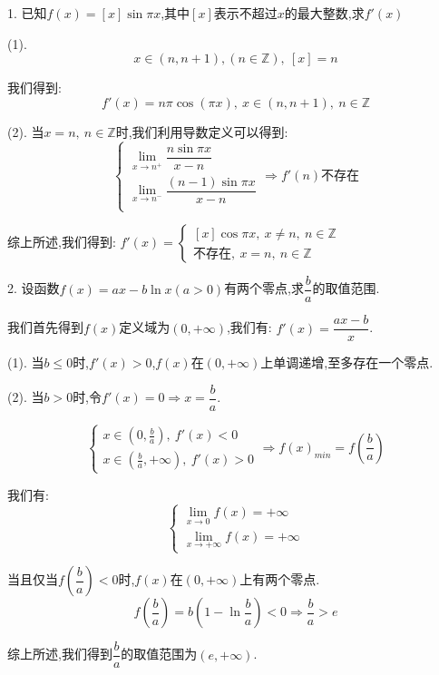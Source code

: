 1. 已知$f(x)=[x]\sin \pi x$,其中$[x]$表示不超过$x$的最大整数,求$f'(x)$
\begin{solution}

	(1). 
	$$x\in(n,n+1),(n\in\mathbb{Z}),\ [x]=n$$
	
	我们得到:  $$f'(x)=n\pi\cos(\pi x),\ x\in(n,n+1), \ n\in\mathbb{Z}$$
	
	(2). 当$x=n,\ n\in\mathbb{Z}$时,我们利用导数定义可以得到:  
	$$\left\lbrace
	\begin{array}{l}
		\lim\limits_{x\rightarrow n^{+}}\dfrac{n\sin \pi x}{x-n}\\
		\lim\limits_{x\rightarrow n^{-}}\dfrac{(n-1)\sin \pi x}{x-n}\\
	\end{array}
	\right.\Rightarrow f'(n)\text{不存在}$$
	
	综上所述,我们得到:  $f'(x)=\left\lbrace
	\begin{array}{l}
		[x]\cos \pi x,\ x\neq n,\ n\in\mathbb{Z}\\
		\text{不存在},\ x=n,\ n\in\mathbb{Z}
	\end{array}
	\right. $
\end{solution}

2. 设函数$f(x)=ax-b\ln x(a>0)$有两个零点,求$\dfrac{b}{a}$的取值范围.
\begin{solution}

	我们首先得到$f(x)$定义域为$(0,+\infty)$,我们有:  $f'(x)=\dfrac{ax-b}{x}$.
	
	(1). 当$b\leq 0$时,$f'(x)>0$,$f(x)$在$(0,+\infty)$上单调递增,至多存在一个零点.
	
	(2). 当$b>0$时,令$f'(x)=0\Rightarrow x=\dfrac{b}{a}$.
	
	$$\left\lbrace
	\begin{array}{l}
		x\in(0,\frac{b}{a}),\ f'(x)<0\\
		x\in(\frac{b}{a},+\infty),\ f'(x)>0
	\end{array}
	\right. \Rightarrow f(x)_{min}=f(\dfrac{b}{a})$$
	
	我们有:  $$\left\lbrace
	\begin{array}{l}
		\lim\limits_{x\rightarrow 0}f(x)=+\infty\\
		\lim\limits_{x\rightarrow +\infty}f(x)=+\infty
	\end{array}
	\right. $$
	
	当且仅当$f(\dfrac{b}{a})<0$时,$f(x)$在$(0,+\infty)$上有两个零点.
	$$f(\dfrac{b}{a})=b(1-\ln\dfrac{b}{a})<0\Rightarrow \dfrac{b}{a}>e$$
	
	综上所述,我们得到$\dfrac{b}{a}$的取值范围为$(e,+\infty)$.
\end{solution}

